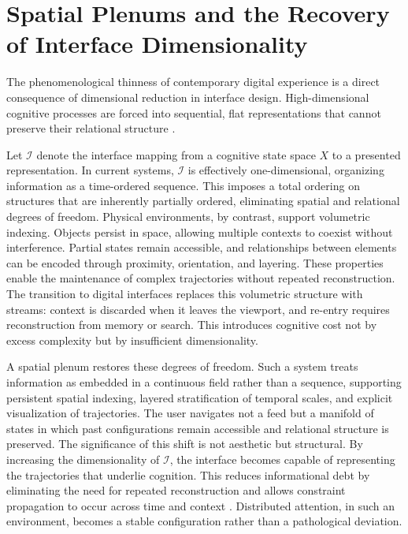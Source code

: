 \documentclass[12pt, a4paper]{article}
\begin{document}
\section{Spatial Plenums and the Recovery of Interface Dimensionality}

The phenomenological thinness of contemporary digital experience is a direct consequence of dimensional reduction in interface design. High-dimensional cognitive processes are forced into sequential, flat representations that cannot preserve their relational structure \cite{Hutchins1995,Suchman2007}.

Let $\mathcal{I}$ denote the interface mapping from a cognitive state space $X$ to a presented representation. In current systems, $\mathcal{I}$ is effectively one-dimensional, organizing information as a time-ordered sequence. This imposes a total ordering on structures that are inherently partially ordered, eliminating spatial and relational degrees of freedom. Physical environments, by contrast, support volumetric indexing. Objects persist in space, allowing multiple contexts to coexist without interference. Partial states remain accessible, and relationships between elements can be encoded through proximity, orientation, and layering. These properties enable the maintenance of complex trajectories without repeated reconstruction. The transition to digital interfaces replaces this volumetric structure with streams: context is discarded when it leaves the viewport, and re-entry requires reconstruction from memory or search. This introduces cognitive cost not by excess complexity but by insufficient dimensionality.

A spatial plenum restores these degrees of freedom. Such a system treats information as embedded in a continuous field rather than a sequence, supporting persistent spatial indexing, layered stratification of temporal scales, and explicit visualization of trajectories. The user navigates not a feed but a manifold of states in which past configurations remain accessible and relational structure is preserved. The significance of this shift is not aesthetic but structural. By increasing the dimensionality of $\mathcal{I}$, the interface becomes capable of representing the trajectories that underlie cognition. This reduces informational debt by eliminating the need for repeated reconstruction and allows constraint propagation to occur across time and context \cite{Clark2013}. Distributed attention, in such an environment, becomes a stable configuration rather than a pathological deviation.
\end{document}
